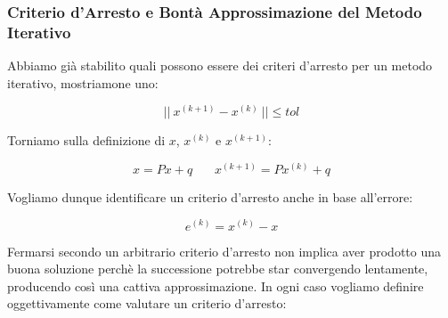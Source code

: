 \documentclass{article}
\begin{document}
\newpage

\subsubsection{Criterio d'Arresto e Bontà Approssimazione del Metodo Iterativo}

Abbiamo già stabilito quali possono essere dei criteri d'arresto per un metodo iterativo, mostriamone uno:

\[ ||\: x^{(k+1)} - x^{(k)} \:|| \leq tol \]

Torniamo sulla definizione di $x$, $x^{(k)}$ e $x^{(k+1)}$:

\[ \boxed{x = Px + q} \: \: \: \: \: \: \: \: \boxed{x^{(k+1)} = Px^{(k)}+q} \]

Vogliamo dunque identificare un criterio d'arresto anche in base all'errore:

\[ e^{(k)} = x^{(k)} - x \]

Fermarsi secondo un arbitrario criterio d'arresto non implica aver prodotto una buona soluzione perchè la successione potrebbe star convergendo lentamente, producendo così una cattiva approssimazione.
In ogni caso vogliamo definire oggettivamente come valutare un criterio d'arresto:
\end{document}
